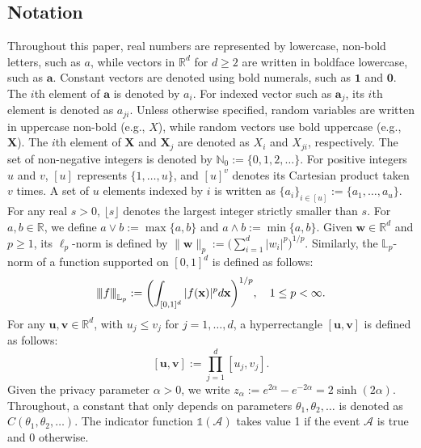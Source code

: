 \documentclass[twoside,11pt]{article}
\newcommand{\indicator}[1]{\mathds{1}\left( #1 \right) }%
\newcommand{\vertiii}[1]{
	{\left\vert\kern-0.25ex\left\vert\kern-0.25ex\left\vert #1 
		\right\vert\kern-0.25ex\right\vert\kern-0.25ex\right\vert}
}%
\newcommand{\vectorize}[1]{\mathbf{#1}}
\newcommand{\dimDensity}{d} %
\newcommand{\domainTs}{
	[0,1]^{{\dimDensity}}
}
\begin{document}
\subsection{Notation}\label{subsection:notation}
Throughout this paper, real numbers are represented by lowercase, non-bold letters, such as \(a\), while vectors in \( \mathbb{R}^d \) for \(d \geq 2\) are written in boldface lowercase, such as \( \mathbf{a} \). Constant vectors are denoted using bold numerals, such as \( \mathbf{1} \) and \( \mathbf{0} \). The $i$th element of \( \mathbf{a} \) is denoted by \( a_i \). For indexed vector such as $\vectorize{a}_j$, its $i$th element is denoted as \( a_{ji} \). Unless otherwise specified, random variables are written in uppercase non-bold (e.g., \( X \)), while random vectors use bold uppercase (e.g., \( \mathbf{X} \)). The $i$th element of $\vectorize{X}$ and $\vectorize{X}_j$ are denoted as $X_i$ and $X_{ji}$, respectively.
The set of non-negative integers is denoted by \( \mathbb{N}_0 := \{0,1,2,\ldots\} \). For positive integers \( u \) and \( v \), \( [u] \) represents \( \{1, \ldots, u\} \), and \( [u]^v \) denotes its Cartesian product taken \( v \) times. A set of \( u \) elements indexed by \( i \) is written as \( \{a_i\}_{i \in [u]} := \{a_1, \ldots, a_u\} \).
For any real \( s > 0 \), \( \lfloor s \rfloor \) denotes the largest integer strictly smaller than \( s \). For \( a, b \in \mathbb{R} \), we define \( a \vee b := \max\{a, b\} \) and \( a \wedge b := \min \{a, b\} \). Given \( \mathbf{w} \in \mathbb{R}^d \) and \( p \geq 1 \), its \( \ell_p \)-norm is defined by \( \|\mathbf{w}\|_p := \bigl(\sum_{i=1}^d |w_i|^p\bigr)^{1/p} \). Similarly, the \( \mathbb{L}_p \)-norm of a function supported on \( [0,1]^d \) is defined as follows:
$$
\vertiii{f}_{\mathbb{L}_p}
:=
\biggl(
\int_{\domainTs}
|f(\vectorize{x})|^p d\vectorize{x}
\biggr)^{1/p},
\quad
1 \leq p < \infty.
$$
For any  $\vectorize{u}, \vectorize{v} \in \mathbb{R}^\dimDensity$,
with $u_j \leq v_j$ for  $j=1, \ldots, d$, a hyperrectangle $[\vectorize{u},\vectorize{v}]$ is defined as follows:
$$
[\vectorize{u},\vectorize{v}] := \prod_{j=1}^\dimDensity [u_j, v_j].
$$
Given the privacy parameter $\alpha > 0$, we write $z_\alpha := e^{2\alpha}- e^{-2\alpha} = 2 \sinh(2\alpha)$. Throughout, a constant that only depends on parameters $\theta_1,\theta_2,\ldots$ is denoted as $C(\theta_1,\theta_2,\ldots)$. The indicator function $\indicator{\mathcal{A}} $ takes value 1 if the event $\mathcal{A}$ is true and 0 otherwise.
\end{document}
